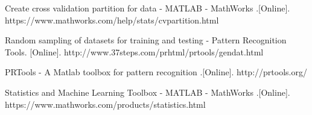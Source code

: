 \begin{thebibliography}{5}
 Create cross validation partition for data - MATLAB - MathWorks .[Online]. https://www.mathworks.com/help/stats/cvpartition.html

 Random sampling of datasets for training and testing - Pattern Recognition Tools. [Online]. http://www.37steps.com/prhtml/prtools/gendat.html

 PRTools - A Matlab toolbox for pattern recognition .[Online]. http://prtools.org/

 Statistics and Machine Learning Toolbox - MATLAB - MathWorks .[Online]. https://www.mathworks.com/products/statistics.html
\end{thebibliography}